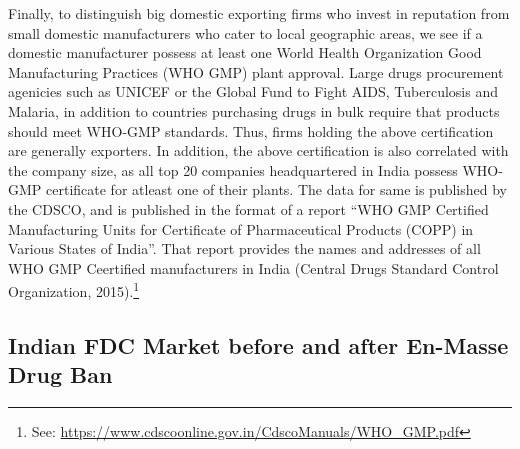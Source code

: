 \documentclass[AER]{AEA}
\theoremstyle{theorem}
\begin{document}
Finally, to distinguish big domestic exporting firms who invest in reputation from small domestic manufacturers who cater to local geographic areas, we see if a domestic manufacturer possess at least one World Health Organization Good Manufacturing Practices (WHO GMP) plant approval. Large drugs procurement agenicies such as UNICEF or the Global Fund to Fight AIDS, Tuberculosis and Malaria, in addition to countries purchasing drugs in bulk require that products should meet WHO-GMP standards. Thus, firms holding the above certification are generally exporters. In addition, the above certification is also correlated with the company size, as all top 20 companies headquartered in India possess WHO-GMP certificate for atleast one of their plants. The data for same is published by the CDSCO, and is published in the format of a report ``WHO GMP Certified Manufacturing Units for Certificate of Pharmaceutical Products (COPP) in Various States of India''. That report provides the names and addresses of all WHO GMP Ceertified manufacturers in India (Central Drugs Standard Control Organization, 2015).\footnote{See: \url{https://www.cdscoonline.gov.in/CdscoManuals/WHO\_GMP.pdf}}

\subsection{Indian FDC Market before and after En-Masse Drug Ban}
\end{document}

